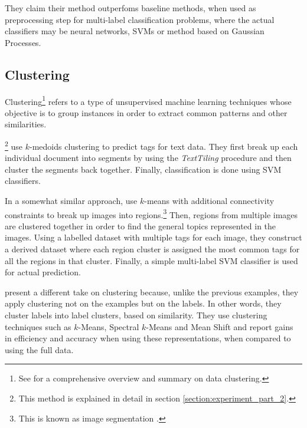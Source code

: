 They claim their method outperfoms baseline methods, when used as preprocessing step for multi-label classification problems, where the actual classifiers may be neural networks, SVMs or method based on Gaussian Processes.






\subsection{Clustering}

Clustering\footnote{See \cite{jain_2010} for a comprehensive overview and summary on data clustering.} refers to a type of unsupervised machine learning techniques whose objective is to group instances in order to extract common patterns and other similarities.

\cite{shen_etal_2009}\footnote{This method is explained in detail in section \ref{section:experiment_part_2}.} use $k$-medoids clustering to predict tags for text data. They first break up each individual document into segments by using the \textit{TextTiling}  procedure \citep{hearst_1994} and then cluster the segments back together. Finally, classification is done using SVM classifiers.

In a somewhat similar approach, \cite{nikolopoulos_etal_2009} use $k$-means with additional connectivity constraints to break up images into regions.\footnote{This is known as image segmentation \citep{haralick_shapiro_1985}.} Then, regions from multiple images are clustered together in order to find the general topics represented in the images. Using a labelled dataset with multiple tags for each image, they construct a derived dataset where each region cluster is assigned the most common tags for all the regions in that cluster. Finally, a simple multi-label SVM classifier is used for actual prediction. 

\cite{leginus_etal_2012} present a different take on clustering because, unlike the previous examples, they apply clustering not on the examples but on the labels. In other words, they cluster labels into label clusters, based on similarity. They use clustering techniques such as $k$-Means, Spectral $k$-Means and Mean Shift and report gains in efficiency and accuracy when using these representations, when compared to using the full data.



